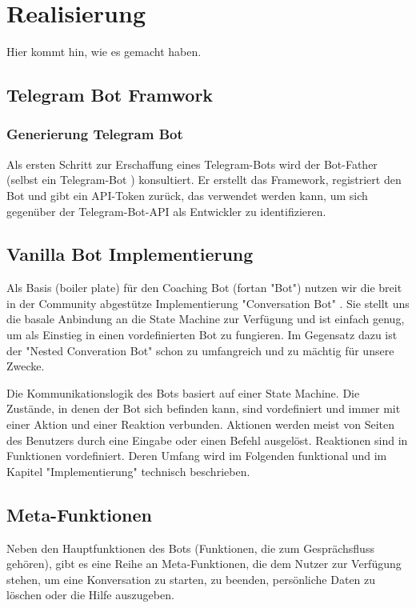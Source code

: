 \chapter{Realisierung}

Hier kommt hin, wie es gemacht haben.  



    \section{Telegram Bot Framwork}

        \subsection{Generierung Telegram Bot}

            Als ersten Schritt zur Erschaffung eines Telegram-Bots wird der Bot-Father (selbst ein Telegram-Bot \cite{coreTelegram}) konsultiert.  Er erstellt das Framework, registriert den Bot und gibt ein API-Token zurück, das verwendet werden kann, um sich gegenüber der Telegram-Bot-API als Entwickler zu identifizieren. \cite{telegramAPI}


        \section{Vanilla Bot Implementierung}
            Als Basis (boiler plate) für den Coaching Bot (fortan "Bot") nutzen wir die breit in der Community abgestütze Implementierung "Conversation Bot" \cite{conversationBot}. Sie stellt uns die basale Anbindung an die State Machine zur Verfügung und ist einfach genug, um als Einstieg in einen vordefinierten Bot zu fungieren. Im Gegensatz dazu ist der "Nested Converation Bot" schon zu umfangreich und zu mächtig für unsere Zwecke.

            Die Kommunikationslogik des Bots basiert auf einer State Machine. Die Zustände, in denen der Bot sich befinden kann, sind vordefiniert und immer mit einer Aktion und einer Reaktion verbunden. Aktionen werden meist von Seiten des Benutzers durch eine Eingabe oder einen Befehl ausgelöst. Reaktionen sind in Funktionen vordefiniert. Deren Umfang wird im Folgenden funktional und im Kapitel "Implementierung" technisch beschrieben.

    
    \section{Meta-Funktionen}
        Neben den Hauptfunktionen des Bots (Funktionen, die zum Gesprächsfluss gehören), gibt es eine Reihe an Meta-Funktionen, die dem Nutzer zur Verfügung stehen, um eine Konversation zu starten, zu beenden, persönliche Daten zu löschen oder die Hilfe auszugeben.

